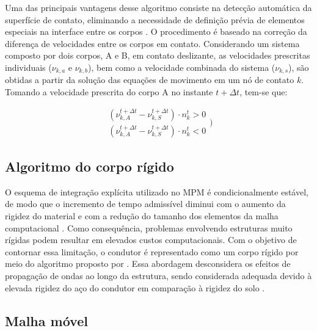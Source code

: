 Uma das principais vantagens desse algoritmo consiste na detecção automática da superfície de contato, eliminando a necessidade de definição prévia de elementos especiais na interface entre os corpos \cite{alkafaji2013}. O procedimento é baseado na correção da diferença de velocidades entre os corpos em contato. Considerando um sistema composto por dois corpos, A e B, em contato deslizante, as velocidades prescritas individuais (${\nu}_{k,a}$ e ${\nu}_{k,b}$), bem como a velocidade combinada do sistema (${\nu}_{k,s}$), são obtidas a partir da solução das equações de movimento em um nó de contato $k$. Tomando a velocidade prescrita do corpo A no instante $t+\Delta t$, tem-se que:


\begin{equation}
	{\begin{matrix}
			(\nu_{k,A}^{t+\Delta t}-\nu_{k,S}^{t+\Delta t}) \cdot n_k^t>0 
			\\
			(\nu_{k,A}^{t+\Delta t}-\nu_{k,S}^{t+\Delta t}) \cdot n_k^t<0
		\end{matrix})}
\end{equation}

\subsection{Algoritmo do corpo rígido}

O esquema de integração explícita utilizado no MPM é condicionalmente estável, de modo que o incremento de tempo admissível diminui com o aumento da rigidez do material e com a redução do tamanho dos elementos da malha computacional \cite{martinelli2020}. Como consequência, problemas envolvendo estruturas muito rígidas podem resultar em elevados custos computacionais. Com o objetivo de contornar essa limitação, o condutor é representado como um corpo rígido por meio do algoritmo proposto por . Essa abordagem desconsidera os efeitos de propagação de ondas ao longo da estrutura, sendo considerada adequada devido à elevada rigidez do aço do condutor em comparação à rigidez do solo \cite{Galavi2019}.

\subsection{Malha móvel}


